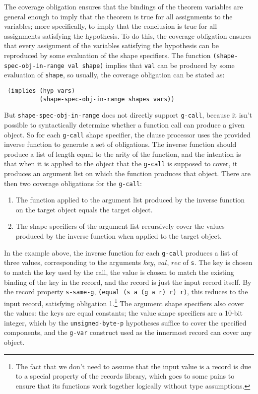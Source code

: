 \documentclass[submission,copyright,creativecommons]{eptcs}
\newcommand*{\var}[1]{\mathit{#1}}
\begin{document}
The coverage obligation ensures that the bindings of the theorem
variables are general enough to imply that the theorem is true for all
assignments to the variables; more specifically, to imply that the
conclusion is true for all assignments satisfying the hypothesis.  To
do this, the coverage obligation ensures that every assignment of the
variables satisfying the hypothesis can be reproduced by some
evaluation of the shape specifiers.  The function
\texttt{(shape-spec-obj-in-range val shape)} implies that \texttt{val}
can be produced by some evaluation of \texttt{shape}, so usually, the
coverage obligation can be stated as:
\begin{verbatim}
 (implies (hyp vars)
          (shape-spec-obj-in-range shapes vars))
\end{verbatim}
\noindent But \texttt{shape-spec-obj-in-range} does not directly
support \texttt{g-call}, because it isn't possible to syntactically
determine whether a function call can produce a given object.  So for
each \texttt{g-call} shape specifier, the clause processor uses the
provided inverse function to generate a set of obligations.  The
inverse function should produce a list of length equal to the arity of
the function, and the intention is that when it is applied to the
object that the \texttt{g-call} is supposed to cover, it produces an
argument list on which the function produces that object.
There are then two coverage obligations for the \texttt{g-call}:
\begin{enumerate}
\item The function applied to the argument list produced by the
  inverse function on the target object equals the target object.
\item The shape specifiers of the argument list recursively cover the
  values produced by the inverse function when applied to the target
  object.
\end{enumerate}

In the example above, the inverse function for each \texttt{g-call}
produces a list of three values, corresponding to the arguments
$\var{key}$, $\var{val}$, $\var{rec}$ of \texttt{s}.  The key is
chosen to match the key used by the call, the value is chosen to match
the existing binding of the key in the record, and the record is just
the input record itself.  By the record property \texttt{s-same-g},
\texttt{(equal (s a (g a r) r) r)}, this reduces to the input record,
satisfying obligation 1.\footnote{The fact that we don't need to
  assume that the input value is a record is due to a special property
  of the records library, which goes to some pains to ensure that its
  functions work together logically without type assumptions.}  The
argument shape specifiers also cover the values: the keys are equal
constants; the value shape specifiers are a 10-bit integer, which by
the \texttt{unsigned-byte-p} hypotheses suffice to cover the specified
components, and the \texttt{g-var} construct used as the innermost
record can cover any object.
\end{document}
